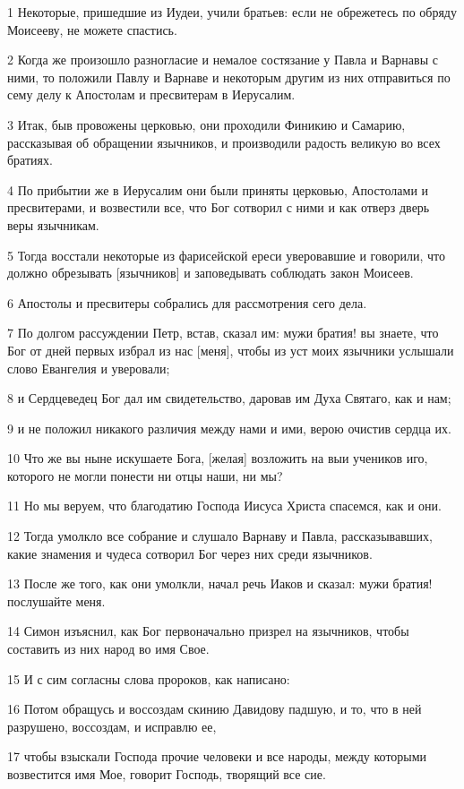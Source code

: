 \par 1 Некоторые, пришедшие из Иудеи, учили братьев: если не обрежетесь по обряду Моисееву, не можете спастись.
\par 2 Когда же произошло разногласие и немалое состязание у Павла и Варнавы с ними, то положили Павлу и Варнаве и некоторым другим из них отправиться по сему делу к Апостолам и пресвитерам в Иерусалим.
\par 3 Итак, быв провожены церковью, они проходили Финикию и Самарию, рассказывая об обращении язычников, и производили радость великую во всех братиях.
\par 4 По прибытии же в Иерусалим они были приняты церковью, Апостолами и пресвитерами, и возвестили все, что Бог сотворил с ними и как отверз дверь веры язычникам.
\par 5 Тогда восстали некоторые из фарисейской ереси уверовавшие и говорили, что должно обрезывать [язычников] и заповедывать соблюдать закон Моисеев.
\par 6 Апостолы и пресвитеры собрались для рассмотрения сего дела.
\par 7 По долгом рассуждении Петр, встав, сказал им: мужи братия! вы знаете, что Бог от дней первых избрал из нас [меня], чтобы из уст моих язычники услышали слово Евангелия и уверовали;
\par 8 и Сердцеведец Бог дал им свидетельство, даровав им Духа Святаго, как и нам;
\par 9 и не положил никакого различия между нами и ими, верою очистив сердца их.
\par 10 Что же вы ныне искушаете Бога, [желая] возложить на выи учеников иго, которого не могли понести ни отцы наши, ни мы?
\par 11 Но мы веруем, что благодатию Господа Иисуса Христа спасемся, как и они.
\par 12 Тогда умолкло все собрание и слушало Варнаву и Павла, рассказывавших, какие знамения и чудеса сотворил Бог через них среди язычников.
\par 13 После же того, как они умолкли, начал речь Иаков и сказал: мужи братия! послушайте меня.
\par 14 Симон изъяснил, как Бог первоначально призрел на язычников, чтобы составить из них народ во имя Свое.
\par 15 И с сим согласны слова пророков, как написано:
\par 16 Потом обращусь и воссоздам скинию Давидову падшую, и то, что в ней разрушено, воссоздам, и исправлю ее,
\par 17 чтобы взыскали Господа прочие человеки и все народы, между которыми возвестится имя Мое, говорит Господь, творящий все сие.
